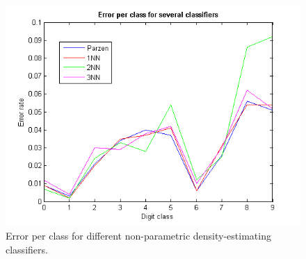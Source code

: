 \begin{figure}[H]
	\centering
	\includegraphics[scale=0.8]{images/pr_figure_2.png}
	\caption{Error per class for different non-parametric density-estimating classifiers.}
	\label{fig:errorpdigit}
\end{figure}
